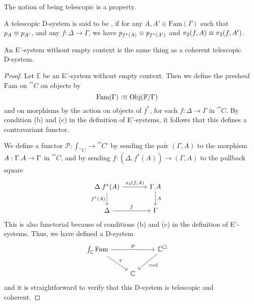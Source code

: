 \begin{conj}
The notion of being telescopic is a property.
\end{conj}

\begin{defn}
A telescopic D-system is said to be , if for any $A,A'\in\mathrm{Fam}(\Gamma)$
such that $p_A\equiv p_{A'}$, and any $f:\Delta\to\Gamma$, we have
$p_{f^\ast(A)}\equiv p_{f^\ast(A')}$ and $\pi_2(f,A)\equiv \pi_2(f,A')$.
\end{defn}

\begin{thm}
An E'-system without empty context is the same thing as a coherent telescopic D-system.
\end{thm}

\begin{proof}
Let $\mathbb{E}$ be an E'-system without empty context. Then we define the
presheaf $\mathrm{Fam}$ on $\cat{C}$ on objects by
\begin{equation*}
\mathrm{Fam}(\Gamma)\vcentcolon\equiv \mathrm{Obj}(\mathbb{F}/\Gamma)
\end{equation*}
and on morphisms by the action on objects of $f^\ast$, for each $f:\Delta\to
\Gamma$ in $\cat{C}$. By condition (b) and (c) in the definition of E'-systems, it
follows that this defines a contravariant functor. 

We define a functor $\mathcal{P}:\int_{\cat{C}}\to\cat{C}^\square$ by sending
the pair $(\Gamma,A)$ to the morphism $A:\ctxext{\Gamma}{A}\to\Gamma$ in
$\cat{C}$, and by sending $f:(\Delta,f^\ast(A))\to (\Gamma,A)$ to the pullback
square
\begin{equation*}
\begin{tikzcd}[column sep=large]
\ctxext{\Delta}{f^\ast(A)} \arrow[d,swap,"{f^\ast(A)}"] \arrow[r,"{\pi_2(f,A)}"] &
\ctxext{\Gamma}{A} \arrow[d,"A"] \\ \Delta \arrow[r,"f"] & \Gamma
\end{tikzcd}
\end{equation*}
This is also functorial because of conditions (b) and (c) in the definition of
E'-systems. Thus, we have defined a D-system
\begin{equation*}
\begin{tikzcd}
\int_{\cat{C}}\mathrm{Fam} \arrow[rr,"{\mathcal{P}}"] \arrow[dr,"{\pi}"] & & \cat{C}^\square \arrow[dl,"{\mathrm{cod}}"] \\ & \cat{C}
\end{tikzcd}
\end{equation*}
and it is straightforward to verify that this D-system is telescopic and coherent.


\end{proof}
